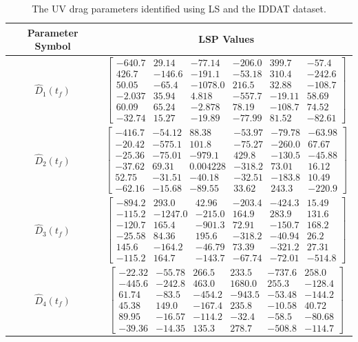 \begin{table}[htbp]
\ssp
\caption{The \ac{UV} drag parameters identified using \ac{LS} and the
  \ac{IDDAT} dataset.}
\begin{center}
\begin{tabular}{c|c}
Parameter Symbol & \ac{LSP} Values \\ \hline
$\hat{D}_1(t_f)$ & $ \left[\begin{array}{cccccc} -640.7 & 29.14 & -77.14 & -206.0 & 399.7 & -57.4\\ 426.7 & -146.6 & -191.1 & -53.18 & 310.4 & -242.6\\ 50.05 & -65.4 & -1078.0 & 216.5 & 32.88 & -108.7\\ -2.037 & 35.94 & 4.818 & -557.7 & -19.11 & 58.69\\ 60.09 & 65.24 & -2.878 & 78.19 & -108.7 & 74.52\\ -32.74 & 15.27 & -19.89 & -77.99 & 81.52 & -82.61 \end{array}\right] $ \\ 
$\hat{D}_2(t_f)$ & $ \left[\begin{array}{cccccc} -416.7 & -54.12 & 88.38 & -53.97 & -79.78 & -63.98\\ -20.42 & -575.1 & 101.8 & -75.27 & -260.0 & 67.67\\ -25.36 & -75.01 & -979.1 & 429.8 & -130.5 & -45.88\\ -37.62 & 69.31 & 0.004228 & -318.2 & 73.01 & 16.12\\ 52.75 & -31.51 & -40.18 & -32.51 & -183.8 & 10.49\\ -62.16 & -15.68 & -89.55 & 33.62 & 243.3 & -220.9 \end{array}\right] $ \\ 
$\hat{D}_3(t_f)$ & $ \left[\begin{array}{cccccc} -894.2 & 293.0 & 42.96 & -203.4 & -424.3 & 15.49\\ -115.2 & -1247.0 & -215.0 & 164.9 & 283.9 & 131.6\\ -120.7 & 165.4 & -901.3 & 72.91 & -150.7 & 168.2\\ -25.58 & 84.36 & 195.6 & -318.2 & -40.94 & 26.2\\ 145.6 & -164.2 & -46.79 & 73.39 & -321.2 & 27.31\\ -115.2 & 164.7 & -143.7 & -67.74 & -72.01 & -514.8 \end{array}\right] $ \\ 
$\hat{D}_4(t_f)$ & $ \left[\begin{array}{cccccc} -22.32 & -55.78 & 266.5 & 233.5 & -737.6 & 258.0\\ -445.6 & -242.8 & 463.0 & 1680.0 & 255.3 & -128.4\\ 61.74 & -83.5 & -454.2 & -943.5 & -53.48 & -144.2\\ 45.38 & 149.0 & -167.4 & 235.8 & -10.58 & 40.72\\ 89.95 & -16.57 & -114.2 & -32.4 & -58.5 & -80.68\\ -39.36 & -14.35 & 135.3 & 278.7 & -508.8 & -114.7 \end{array}\right] $ \\ 

\end{tabular}
\end{center}
\end{table}
